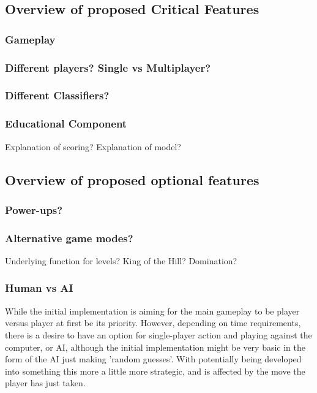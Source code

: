 \documentclass[a4paper,10pt]{article}
\begin{document}
\subsection{Overview of proposed Critical Features}
\subsubsection{Gameplay}


\subsubsection{Different players? Single vs Multiplayer?}
\subsubsection{Different Classifiers?}
\subsubsection{Educational Component}
Explanation of scoring?
Explanation of model?
\subsection{Overview of proposed optional features}
\subsubsection{Power-ups?}
\subsubsection{Alternative game modes?}
Underlying function for levels?
King of the Hill?
Domination?
\subsubsection{Human vs AI}
While the initial implementation is aiming for the main gameplay to be player versus player at first be its priority. However, depending on time requirements, there is a desire to have an option for single-player action and playing against the computer, or AI, although the initial implementation might be very basic in the form of the AI just making 'random guesses'. With potentially being developed into something this more a little more strategic, and is affected by the move the player has just taken.
\end{document}
